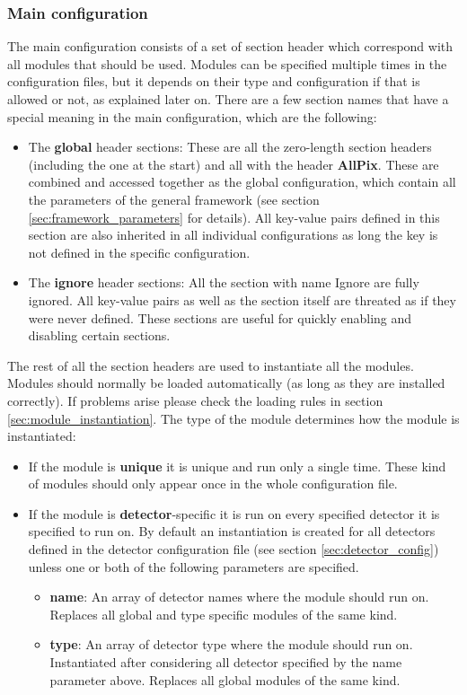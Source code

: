 \subsubsection{Main configuration}
\label{sec:main_config}
The main configuration consists of a set of section header which correspond with all modules that should be used. Modules can be specified multiple times in the configuration files, but it depends on their type and configuration if that is allowed or not, as explained later on. There are a few section names that have a special meaning in the main configuration, which are the following:
\begin{itemize}
\item The \textbf{global} header sections: These are all the zero-length section headers (including the one at the start) and all with the header \textbf{AllPix}. These are combined and accessed together as the global configuration, which contain all the parameters of the general framework (see section \ref{sec:framework_parameters} for details). All key-value pairs defined in this section are also inherited in all individual configurations as long the key is not defined in the specific configuration.
\item The \textbf{ignore} header sections: All the section with name Ignore are fully ignored. All key-value pairs as well as the section itself are threated as if they were never defined. These sections are useful for quickly enabling and disabling certain sections.
\end{itemize}

The rest of all the section headers are used to instantiate all the modules. Modules should normally be loaded automatically (as long as they are installed correctly). If problems arise please check the loading rules in section \ref{sec:module_instantiation}. The type of the module determines how the module is instantiated:
\begin{itemize}
\item If the module is \textbf{unique} it is unique and run only a single time. These kind of modules should only appear once in the whole configuration file.
\item If the module is \textbf{detector}-specific it is run on every specified detector it is specified to run on. By default an instantiation is created for all detectors defined in the detector configuration file (see section \ref{sec:detector_config}) unless one or both of the following parameters are specified.
\begin{itemize}
\item \textbf{name}: An array of detector names where the module should run on. Replaces all global and type specific modules of the same kind.
\item \textbf{type}: An array of detector type where the module should run on. Instantiated after considering all detector specified by the name parameter above. Replaces all global modules of the same kind. 
\end{itemize}
\end{itemize}

